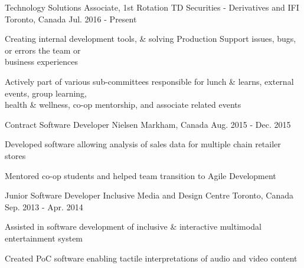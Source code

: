 \begin{cventries}
  \cventry
    {Technology Solutions Associate, 1st Rotation}
    {TD Securities - Derivatives and IFI}
    {Toronto, Canada}
    {Jul. 2016 - Present}
    {
      \begin{cvitems}
        \item {Creating internal development tools, \& solving Production Support issues, bugs, or errors the team or \\business experiences}
        \item {Actively part of various sub-committees responsible for lunch \& learns, external events, group learning, \\health \& wellness, co-op mentorship, and associate related events}
      \end{cvitems}
    }
  \cventry
    {Contract Software Developer}
    {Nielsen}
    {Markham, Canada}
    {Aug. 2015 - Dec. 2015}
    {
      \begin{cvitems}
        \item {Developed software allowing analysis of sales data for multiple chain retailer stores}
        \item {Mentored co-op students and helped team transition to Agile Development}
      \end{cvitems}
    }
  \cventry
    {Junior Software Developer}
    {Inclusive Media and Design Centre}
    {Toronto, Canada}
    {Sep. 2013 - Apr. 2014}
    {
      \begin{cvitems}
        \item {Assisted in software development of inclusive \& interactive multimodal entertainment system}
        \item {Created PoC software enabling tactile interpretations of audio and video content}
      \end{cvitems}
    }
\end{cventries}
